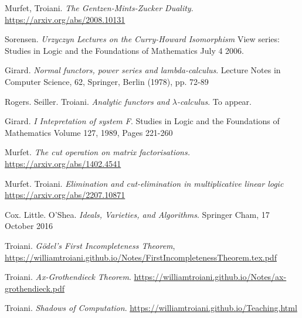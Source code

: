 \documentclass[12pt]{article}
\theoremstyle{plain}
\theoremstyle{definition}
\begin{document}
	
	
	
	
	
	
	
	
	
	
	
	
	
	
	
	
	
	
	\begin{thebibliography}{9}
		 Murfet, Troiani. \emph{The Gentzen-Mints-Zucker Duality}. \url{https://arxiv.org/abs/2008.10131}
		
		 Sorensen. \emph{Urzyczyn Lectures on the Curry-Howard Isomorphism} View series: Studies in Logic and the Foundations of Mathematics July 4 2006.
		
		 Girard. \emph{Normal functors, power series and lambda-calculus}. Lecture Notes in Computer Science, 62, Springer, Berlin (1978), pp. 72-89
		
		 Rogers. Seiller. Troiani. \emph{Analytic functors and $\lambda$-calculus}. To appear.
		
		 Girard. \emph{I Intepretation of system F}. Studies in Logic and the Foundations of Mathematics
		Volume 127, 1989, Pages 221-260
		
		 Murfet. \emph{The cut operation on matrix factorisations.} \url{https://arxiv.org/abs/1402.4541}
		
		 Murfet. Troiani. \emph{Elimination and cut-elimination in multiplicative linear logic} \url{https://arxiv.org/abs/2207.10871}
		
		 Cox. Little. O’Shea. \emph{Ideals, Varieties, and Algorithms}. Springer Cham, 17 October 2016
		
		 Troiani. \emph{G\"{o}del's First Incompleteness Theorem}, \url{https://williamtroiani.github.io/Notes/FirstIncompletenessTheorem.tex.pdf}
		
		 Troiani. \emph{Ax-Grothendieck Theorem}. \url{https://williamtroiani.github.io/Notes/ax-grothendieck.pdf}
		
		 Troiani. \emph{Shadows of Computation}. \url{https://williamtroiani.github.io/Teaching.html}
		\end{thebibliography}
	
	
\end{document}

